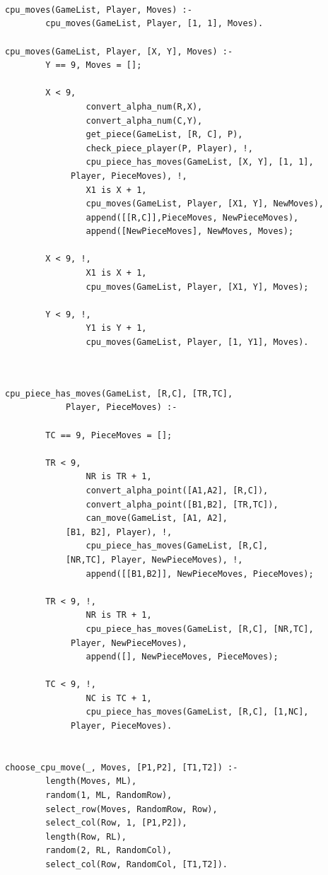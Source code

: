 \begin{lstlisting}



cpu_moves(GameList, Player, Moves) :-
        cpu_moves(GameList, Player, [1, 1], Moves).

cpu_moves(GameList, Player, [X, Y], Moves) :-
        Y == 9, Moves = [];

        X < 9,
                convert_alpha_num(R,X),
                convert_alpha_num(C,Y),
                get_piece(GameList, [R, C], P),
                check_piece_player(P, Player), !,
                cpu_piece_has_moves(GameList, [X, Y], [1, 1],
			 Player, PieceMoves), !,
                X1 is X + 1,
                cpu_moves(GameList, Player, [X1, Y], NewMoves),
                append([[R,C]],PieceMoves, NewPieceMoves),
                append([NewPieceMoves], NewMoves, Moves);
        
        X < 9, !,
                X1 is X + 1,
                cpu_moves(GameList, Player, [X1, Y], Moves);
        
        Y < 9, !,
                Y1 is Y + 1,
                cpu_moves(GameList, Player, [1, Y1], Moves).


\end{lstlisting}

\newpage

\begin{lstlisting}

cpu_piece_has_moves(GameList, [R,C], [TR,TC], 
			Player, PieceMoves) :-
        
        TC == 9, PieceMoves = [];
        
        TR < 9,
                NR is TR + 1,
                convert_alpha_point([A1,A2], [R,C]),
                convert_alpha_point([B1,B2], [TR,TC]),
                can_move(GameList, [A1, A2], 
			[B1, B2], Player), !,
                cpu_piece_has_moves(GameList, [R,C], 
			[NR,TC], Player, NewPieceMoves), !,
                append([[B1,B2]], NewPieceMoves, PieceMoves);
        
        TR < 9, !,
                NR is TR + 1,
                cpu_piece_has_moves(GameList, [R,C], [NR,TC],
			 Player, NewPieceMoves),
                append([], NewPieceMoves, PieceMoves);
        
        TC < 9, !,
                NC is TC + 1,
                cpu_piece_has_moves(GameList, [R,C], [1,NC],
			 Player, PieceMoves).


choose_cpu_move(_, Moves, [P1,P2], [T1,T2]) :-
        length(Moves, ML),
        random(1, ML, RandomRow),
        select_row(Moves, RandomRow, Row),
        select_col(Row, 1, [P1,P2]),
        length(Row, RL),
        random(2, RL, RandomCol),
        select_col(Row, RandomCol, [T1,T2]).



\end{lstlisting}

